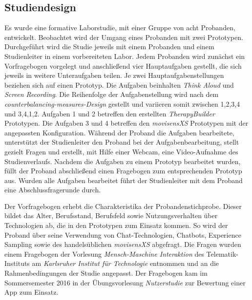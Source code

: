 \subsection{Studiendesign}
Es wurde eine formative Laborstudie, mit einer Gruppe von acht Probanden, entwickelt. Beobachtet wird der Umgang eines Probanden mit  zwei Prototypen. Durchgeführt wird die Studie jeweils mit einem Probanden und einem Studienleiter in einem vorbereiteten Labor. Jedem Probanden wird zunächst ein Vorfragebogen vorgelegt und anschließend vier Hauptaufgaben gestellt, die sich jeweils in weitere Unteraufgaben teilen. Je zwei Hauptaufgabenstellungen beziehen sich auf einen Prototyp. 
Die Aufgaben beinhalten \emph{Think Aloud} und \emph{Screen Recording}. Die Reihenfolge der Aufgabenstellung wird nach dem \emph{counterbalancing-measures-Design} gestellt und variieren somit zwischen 1,2,3,4 und 3,4,1,2. Aufgaben 1 und 2 betreffen den erstellten \emph{TherapyBuilder} Prototypen. Die Aufgaben 3 und 4 betreffen den \emph{movisensXS} Prototypen mit der angepassten Konfiguration. Während der Proband die Aufgaben bearbeitete, unterstützt der Studienleiter den Proband bei der Aufgabenbearbeitung, stellt gezielt Fragen und erstellt, mit Hilfe einer Webcam, eine Video-Aufnahme des Studienverlaufs. Nachdem die Aufgaben zu einem Prototyp bearbeitet wurden, füllt der Proband abschließend einen Fragebogen zum entsprechenden Prototyp aus. Wurden alle Aufgaben bearbeitet führt der Studienleiter mit dem Proband eine Abschlussfragerunde durch.

Der Vorfragebogen erhebt die Charakteristika der Probandenstichprobe. Dieser bildet das Alter, Berufsstand, Berufsfeld sowie Nutzungsverhalten über Technologien ab, die in den Prototypen zum Einsatz kommen. So wird der Proband über seine Verwendung von Chat-Technologien, Chatbots, Experience Sampling sowie des handelsüblichen \emph{movisensXS} abgefragt. Die Fragen wurden einem Fragebogen der Vorlesung \emph{Mensch-Maschine Interaktion} des Telematik-Instituts am  \emph{Karlsruher Institut für Technologie} entnommen und an die Rahmenbedingungen der Studie angepasst. Der Fragebogen kam im Sommersemester 2016 in der Übungsvorlesung \emph{Nutzerstudie} zur Bewertung einer App zum Einsatz.


